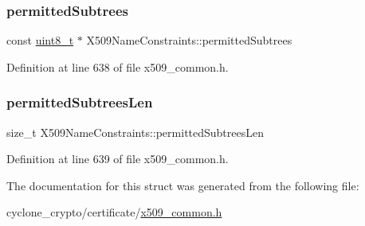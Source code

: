 \subsubsection{\texorpdfstring{permitted\+Subtrees}{permittedSubtrees}}
{\footnotesize\ttfamily const \hyperlink{stdint_8h_aba7bc1797add20fe3efdf37ced1182c5}{uint8\+\_\+t} $\ast$ X509\+Name\+Constraints\+::permitted\+Subtrees}



Definition at line 638 of file x509\+\_\+common.\+h.

\mbox{\label{structX509NameConstraints_aaada0ccb4f22f65db2b71493b14327c0}} 
\subsubsection{\texorpdfstring{permitted\+Subtrees\+Len}{permittedSubtreesLen}}
{\footnotesize\ttfamily size\+\_\+t X509\+Name\+Constraints\+::permitted\+Subtrees\+Len}



Definition at line 639 of file x509\+\_\+common.\+h.



The documentation for this struct was generated from the following file\+:\begin{DoxyCompactItemize}
\item 
cyclone\+\_\+crypto/certificate/\hyperlink{certificate_2x509__common_8h}{x509\+\_\+common.\+h}\end{DoxyCompactItemize}
